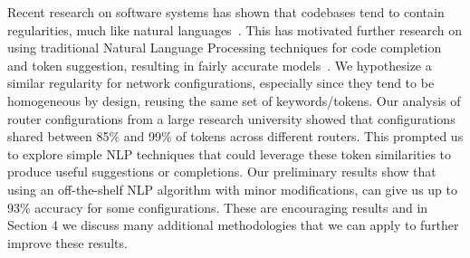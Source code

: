 Recent research on software systems has shown that codebases tend to contain regularities, much like natural languages~\cite{naturalness}. This has motivated further research on using traditional Natural Language Processing techniques for code completion and token suggestion, resulting in fairly accurate models~\cite{naturalness, raychev}. We hypothesize a similar regularity for network configurations, especially since they tend to be homogeneous by design, reusing the same set of keywords/tokens. Our analysis of router configurations from a large research university showed that configurations shared between 85\% and 99\% of tokens across different routers. This prompted us to explore simple NLP techniques that could leverage these token similarities to produce useful suggestions or completions. Our preliminary results show that using an off-the-shelf NLP algorithm with minor modifications, can give us up to 93\% accuracy for some configurations. These are encouraging results and in Section 4 we discuss many additional methodologies that we can apply to further improve these results.